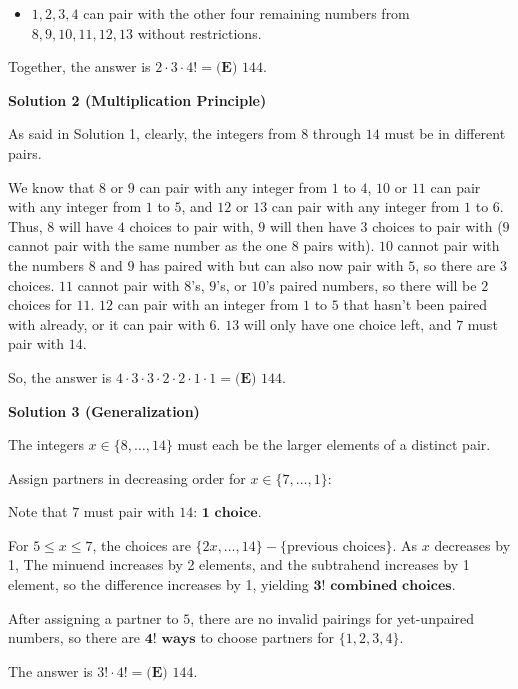 \begin{enumerate}
            \begin{itemize}
        \item $1,2,3,4$ can pair with the other four remaining numbers from $8,9,10,11,12,13$ without restrictions.
            \end{itemize}
            Together, the answer is $2\cdot3\cdot4!=\boxed{\textbf{(E) } 144}.$




\textbf{Solution 2 (Multiplication Principle)}

As said in Solution 1, clearly, the integers from $8$ through $14$ must be in different pairs.

 We know that $8$ or $9$ can pair with any integer from $1$ to $4$, $10$ or $11$ can pair with any integer from $1$ to $5$, and $12$ or $13$ can pair with any integer from $1$ to $6$. Thus, $8$ will have $4$ choices to pair with, $9$ will then have $3$ choices to pair with ($9$ cannot pair with the same number as the one $8$ pairs with). $10$ cannot pair with the numbers $8$ and $9$ has paired with but can also now pair with $5$, so there are $3$ choices. $11$ cannot pair with $8$'s, $9$'s, or $10$'s paired numbers, so there will be $2$ choices for $11$. $12$ can pair with an integer from $1$ to $5$ that hasn't been paired with already, or it can pair with $6$. $13$ will only have one choice left, and $7$ must pair with $14$.

 So, the answer is $4\cdot3\cdot3\cdot2\cdot2\cdot1\cdot1=\boxed{\textbf{(E) } 144}.$




\textbf{Solution 3 (Generalization)}

The integers $x \in \{8, \ldots , 14 \}$ must each be the larger elements of a distinct pair.

 Assign partners in decreasing order for $x \in \{7, \dots, 1\}$:

 Note that $7$ must pair with $14$: $\mathbf{1} \textbf{ choice}$.

 For $5 \leq x \leq 7$, the choices are $\{2x, \dots, 14\} - \{ \text{previous choices}\}$. As $x$ decreases by 1, The minuend increases by 2 elements, and the subtrahend increases by 1 element, so the difference increases by 1, yielding $\mathbf{3!} \textbf{ combined choices}$.

 After assigning a partner to $5$, there are no invalid pairings for yet-unpaired numbers, so there are $\mathbf{4!} \textbf{ ways}$ to choose partners for $\{1,2,3,4\}$.

 The answer is $3! \cdot 4! = \boxed{\textbf{(E) } 144}$.


\end{enumerate}
